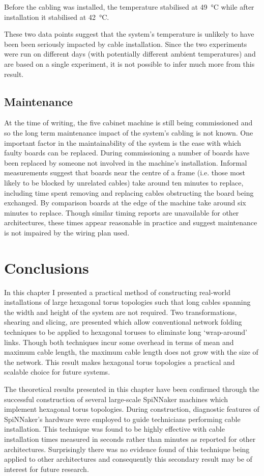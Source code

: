 			Before the cabling was installed, the temperature stabilised at
			\SI{49}{\celsius} while after installation it stabilised at
			\SI{42}{\celsius}.
			
			These two data points suggest that the system's temperature is unlikely
			to have been been seriously impacted by cable installation. Since the two
			experiments were run on different days (with potentially different
			ambient temperatures) and are based on a single experiment, it is not
			possible to infer much more from this result.
			
		\subsection{Maintenance}
			
			At the time of writing, the five cabinet machine is still being
			commissioned and so the long term maintenance impact of the system's
			cabling is not known. One important factor in the maintainability of the
			system is the ease with which faulty boards can be replaced. During
			commissioning a number of boards have been replaced by someone not
			involved in the machine's installation. Informal measurements suggest
			that boards near the centre of a frame (i.e. those most likely to be
			blocked by unrelated cables) take around ten minutes to replace,
			including time spent removing and replacing cables obstructing the board
			being exchanged. By comparison boards at the edge of the machine take
			around six minutes to replace. Though similar timing reports are
			unavailable for other architectures, these times appear reasonable in
			practice and suggest maintenance is not impaired by the wiring plan used.
	
	\section{Conclusions}
		
		In this chapter I presented a practical method of constructing real-world
		installations of large hexagonal torus topologies such that long cables
		spanning the width and height of the system are not required. Two
		transformations, shearing and slicing, are presented which allow
		conventional network folding techniques to be applied to hexagonal toruses
		to eliminate long `wrap-around' links. Though both techniques incur some
		overhead in terms of mean and maximum cable length, the maximum cable
		length does not grow with the size of the network. This result makes
		hexagonal torus topologies a practical and scalable choice for future
		systems.
		
		The theoretical results presented in this chapter have been confirmed
		through the successful construction of several large-scale SpiNNaker
		machines which implement hexagonal torus topologies. During construction,
		diagnostic features of SpiNNaker's hardware were employed to guide
		technicians performing cable installation. This technique was found to be
		highly effective with cable installation times measured in seconds rather
		than minutes as reported for other architectures. Surprisingly there was no
		evidence found of this technique being applied to other architectures and
		consequently this secondary result may be of interest for future research.
